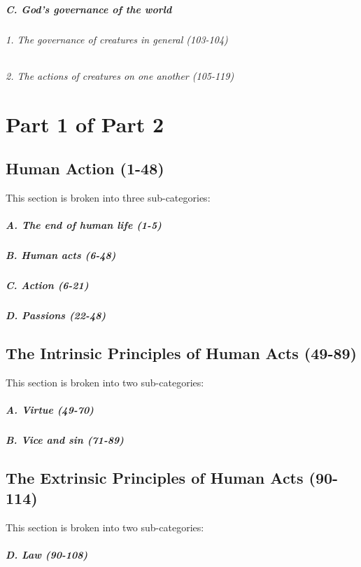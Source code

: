 \documentclass{ucetd}
\begin{document}
\paragraph{C. God’s governance of the world}
\subparagraph{1.   The governance of creatures in general (103-104)}
\subparagraph{2.   The actions of creatures on one another (105-119)}
\clearpage

\chapter{Part 1 of Part 2}

\section{Human Action (1-48)}
This section is broken into three sub-categories:
\paragraph{A. The end of human life (1-5)}
\paragraph{B. Human acts (6-48)}
\paragraph{C. Action (6-21)}
\paragraph{D. Passions (22-48)}
\clearpage
\section{The Intrinsic Principles of Human Acts (49-89)}
This section is broken into two sub-categories:
\paragraph{A. Virtue (49-70)}
\paragraph{B. Vice and sin (71-89)}
\clearpage
\section{The Extrinsic Principles of Human Acts (90-114)}
This section is broken into two sub-categories:
\paragraph{D. Law (90-108)}
\end{document}
